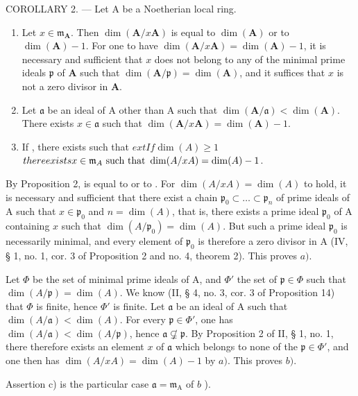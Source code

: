 COROLLARY 2. --- Let A be a Noetherian local ring.

\begin{enumerate}
\def\labelenumi{\alph{enumi})}
\item
  Let \(x \in \mathfrak{m}_{\mathbf{A}}\). Then \(\dim(\mathbf{A}/x\mathbf{A})\) is equal to \(\dim(\mathbf{A})\) or to \(\dim(\mathbf{A}) - 1\). For one to have \(\dim(\mathbf{A}/x\mathbf{A}) = \dim(\mathbf{A}) - 1\), it is necessary and sufficient that \(x\) does not belong to any of the minimal prime ideals \(\mathfrak{p}\) of \(\mathbf{A}\) such that \(\dim(\mathbf{A}/\mathfrak{p}) = \dim(\mathbf{A})\), and it suffices that \(x\) is not a zero divisor in \(\mathbf{A}\).
\item
  Let \(\mathfrak{a}\) be an ideal of A other than A such that \(\dim(\mathbf{A}/\mathfrak{a}) < \dim(\mathbf{A})\). There exists \(x \in \mathfrak{a}\) such that \(\dim(\mathbf{A}/x\mathbf{A}) = \dim(\mathbf{A}) - 1\).
\item
  If , there exists  such that \(	ext{If} \dim(A) \geqslant 1\)\(there exists x \in \mathfrak{m}_{A} \text{ \text{such that} } \dim(A/xA) = \dim(A) - 1\).
\end{enumerate}

By Proposition 2,  is equal to  or to . For \(\dim(A/xA) = \dim(A)\) to hold, it is necessary and sufficient that there exist a chain \(\mathfrak{p}_0 \subset \ldots \subset \mathfrak{p}_n\) of prime ideals of A such that \(x \in \mathfrak{p}_0\) and \(n = \dim(A)\), that is, there exists a prime ideal \(\mathfrak{p}_0\) of A containing \(x\) such that \(\dim(A/\mathfrak{p}_0) = \dim(A)\). But such a prime ideal \(\mathfrak{p}_0\) is necessarily minimal, and every element of \(\mathfrak{p}_0\) is therefore a zero divisor in A (IV, § 1, no. 1, cor. 3 of Proposition 2 and no. 4, theorem 2). This proves \(a)\).

Let \(\Phi\) be the set of minimal prime ideals of A, and \(\Phi'\) the set of \(\mathfrak{p} \in \Phi\) such that \(\dim(A/\mathfrak{p}) = \dim(A)\). We know (II, § 4, no. 3, cor. 3 of Proposition 14) that \(\Phi\) is finite, hence \(\Phi'\) is finite. Let \(\mathfrak{a}\) be an ideal of A such that \(\dim(A/\mathfrak{a}) < \dim(A)\). For every \(\mathfrak{p} \in \Phi'\), one has \(\dim(A/\mathfrak{a}) < \dim(A/\mathfrak{p})\), hence \(\mathfrak{a} \not\subsetneq \mathfrak{p}\). By Proposition 2 of II, § 1, no. 1, there therefore exists an element \(x\) of \(\mathfrak{a}\) which belongs to none of the \(\mathfrak{p} \in \Phi'\), and one then has \(\dim(A/xA) = \dim(A) - 1\) by \(a)\). This proves \(b)\).

Assertion c) is the particular case \(\mathfrak{a} = \mathfrak{m}_{\mathrm{A}}\) of \(b\) ).
